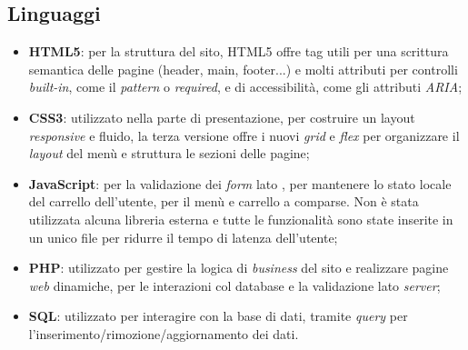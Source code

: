 \documentclass{template}
\begin{document}
	\subsection{Linguaggi}
	\begin{itemize}
		\item \textbf{HTML5}: per la struttura del sito, HTML5 offre tag utili per una scrittura semantica delle pagine (header, main, footer...) e molti attributi per controlli \textit{built-in}, come il \textit{pattern} o \textit{required}, e di accessibilità, come gli attributi \textit{ARIA};
		\item \textbf{CSS3}: utilizzato nella parte di presentazione, per costruire un layout \textit{responsive} e fluido, la terza versione offre i nuovi \textit{grid} e \textit{flex} per organizzare il \textit{layout} del menù e struttura le sezioni delle pagine;
		\item \textbf{JavaScript}: per la validazione dei \textit{form} lato , per mantenere lo stato locale del carrello dell'utente, per il menù e carrello a comparse. Non è stata utilizzata alcuna libreria esterna e tutte le funzionalità sono state inserite in un unico file per ridurre il tempo di latenza dell'utente;
		\item \textbf{PHP}: utilizzato per gestire la logica di \textit{business} del sito e realizzare pagine \textit{web} dinamiche, per le interazioni col database e la validazione lato \textit{server};
		\item \textbf{SQL}: utilizzato per interagire con la base di dati, tramite \textit{query} per l'inserimento/rimozione/aggiornamento dei dati.
	\end{itemize}
\end{document}
